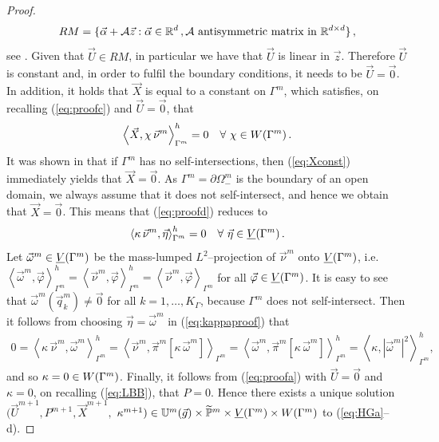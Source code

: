 \begin{proof}
\begin{equation}
RM=\{\vec \alpha + \mathcal A \vec z:\vec \alpha \in \mathbb R^d\,,
\mathcal A \mbox{ antisymmetric matrix in }\mathbb R^{d\times d} \}\,,
\end{equation}
see \cite{Mardal2006}. Given that $\vec U \in RM$, in particular we have that
$\vec U$ is linear in $\vec z$. Therefore $\vec U$ is constant and, in order
to fulfil the boundary conditions, it needs to be $\vec U = \vec 0$. In
addition, it holds that $\vec X$ is equal to a constant on $\Gamma^m$, which
satisfies, on recalling (\ref{eq:proofc}) and $\vec U = \vec 0$, that
\begin{equation} \label{eq:Xconst}
\left\langle \vec X, \chi\,\vec\nu^m \right\rangle_{\Gamma^m}^h = 0
\quad\forall\ \chi \in W(\Gamma^m)\,.
\end{equation}
It was shown in \cite[Proof of Theorem~2.1]{gflows3d} that if $\Gamma^m$
has no self-intersections, then (\ref{eq:Xconst}) immediately yields that $\vec
X = \vec 0$. As $\Gamma^m = \partial\Omega^m_-$ is the boundary of an open
domain, we always assume that it does not self-intersect, and
hence we obtain that $\vec X = \vec 0$. This means that (\ref{eq:proofd})
reduces to
\begin{equation} \label{eq:kappaproof}
\left\langle \kappa\,\vec\nu^m, \vec\eta \right\rangle_{\Gamma^m}^h = 0
\quad\forall\ \vec\eta \in \underline{V}(\Gamma^m)\,.
\end{equation}
Let $\vec\omega^m \in \underline{V}(\Gamma^m)$ be the mass-lumped $L^2$--projection of $\vec\nu^m$
onto $\underline{V}(\Gamma^m)$, i.e. $\left\langle \vec\omega^m, \vec\varphi
\right\rangle_{\Gamma^m}^h = \left\langle \vec\nu^m,
\vec\varphi \right\rangle_{\Gamma^m}^h = \left\langle \vec\nu^m,
\vec\varphi \right\rangle_{\Gamma^m}$ for all $\vec\varphi\in\underline{V}(\Gamma^m)$. It is easy
to see that $\vec\omega^m (\vec q^m_k) \not= \vec 0$ for
all $k=1,\ldots,K_\Gamma$, because $\Gamma^m$ does not self-intersect.
Then it follows from choosing $\vec\eta = \vec\omega^m$ in (\ref{eq:kappaproof})
that
\begin{align*}
0 = \left\langle \kappa\,\vec\nu^m, \vec\omega^m \right\rangle_{\Gamma^m}^h
= \left\langle \vec\nu^m, \vec\pi^m[\kappa\,\vec\omega^m]
\right\rangle_{\Gamma^m}
= \left\langle \vec\omega^m,
\vec\pi^m[\kappa\,\vec\omega^m] \right\rangle_{\Gamma^m}^h
= \left\langle \kappa, |\vec\omega^m|^2 \right\rangle_{\Gamma^m}^h ,
\end{align*}
and so $\kappa = 0 \in W(\Gamma^m)$. Finally, it follows from (\ref{eq:proofa}) with
$\vec U = \vec 0$ and $\kappa = 0$, on recalling (\ref{eq:LBB}), that $P = 0$.
Hence there exists a unique solution $(\vec U^{m+1}, P^{m+1}, \vec X^{m+1},$
$\kappa^{m+1}) \in \mathbb{U}^{m}(\vec{g})\times \widetilde{\mathbb{P}}^m \times \underline{V}(\Gamma^m) \times W(\Gamma^m)$
to (\ref{eq:HGa}--d).
\end{proof}

